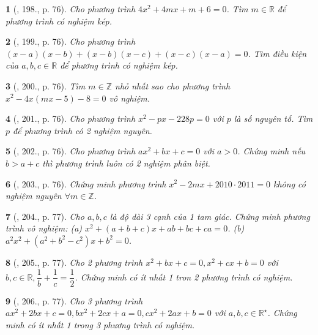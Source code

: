 \documentclass{article}
\newtheorem{baitoan}{}
\begin{document}
\begin{baitoan}[\cite{Tuyen_Toan_9_old}, 198., p. 76]
	Cho phương trình $4x^2 + 4mx + m + 6 = 0$. Tìm $m\in\mathbb{R}$ để phương trình có nghiệm kép.
\end{baitoan}

\begin{baitoan}[\cite{Tuyen_Toan_9_old}, 199., p. 76]
	Cho phương trình $(x - a)(x - b) + (x - b)(x - c) + (x - c)(x - a) = 0$. Tìm điều kiện của $a,b,c\in\mathbb{R}$ để phương trình có nghiệm kép.
\end{baitoan}

\begin{baitoan}[\cite{Tuyen_Toan_9_old}, 200., p. 76]
	Tìm $m\in\mathbb{Z}$ nhỏ nhất sao cho phương trình $x^2 - 4x(mx - 5) - 8 = 0$ vô nghiệm.
\end{baitoan}

\begin{baitoan}[\cite{Tuyen_Toan_9_old}, 201., p. 76]
	Cho phương trình $x^2 - px - 228p = 0$ với $p$ là số nguyên tố. Tìm $p$ để phương trình có 2 nghiệm nguyên.
\end{baitoan}

\begin{baitoan}[\cite{Tuyen_Toan_9_old}, 202., p. 76]
	Cho phương trình $ax^2 + bx + c = 0$ với $a > 0$. Chứng minh nếu $b > a + c$ thì phương trình luôn có 2 nghiệm phân biệt.
\end{baitoan}

\begin{baitoan}[\cite{Tuyen_Toan_9_old}, 203., p. 76]
	Chứng minh phương trình $x^2 - 2mx + 2010\cdot2011 = 0$ không có nghiệm nguyên $\forall m\in\mathbb{Z}$.
\end{baitoan}

\begin{baitoan}[\cite{Tuyen_Toan_9_old}, 204., p. 77]
	Cho $a,b,c$ là độ dài 3 cạnh của 1 tam giác. Chứng minh phương trình vô nghiệm: (a) $x^2 + (a + b + c)x + ab + bc + ca = 0$. (b) $a^2x^2 + (a^2 + b^2 - c^2)x + b^2 = 0$.
\end{baitoan}

\begin{baitoan}[\cite{Tuyen_Toan_9_old}, 205., p. 77]
	Cho 2 phương trình $x^2 + bx + c = 0,x^2 + cx + b = 0$ với $b,c\in\mathbb{R},\dfrac{1}{b} + \dfrac{1}{c} = \dfrac{1}{2}$. Chứng minh có ít nhất 1 tron 2 phương trình có nghiệm.
\end{baitoan}

\begin{baitoan}[\cite{Tuyen_Toan_9_old}, 206., p. 77]
	Cho 3 phương trình $ax^2 + 2bx + c = 0,bx^2 + 2cx + a = 0,cx^2 + 2ax + b = 0$ với $a,b,c\in\mathbb{R}^\star$. Chứng minh có ít nhất 1 trong 3 phương trình có nghiệm.
\end{baitoan}
\end{document}
